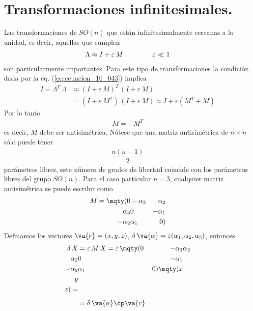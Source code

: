 \section{Transformaciones infinitesimales.}
Las transformaciones de $SO(n)$ que están infinitesimalmente cercanas a la unidad, es decir, aquellas que cumplen
\begin{align}
\Lambda \approx I + \varepsilon \, M \hspace{1.5cm} \varepsilon \ll 1
\label{eq:ecuacion_10_062}
\end{align}
son particularmente importantes. Para este tipo de transformaciones la condición dada por la eq. (\ref{eq:ecuacion_10_043}) implica
\begin{align}
I = \Lambda^{T} \, \Lambda &\approx (I + \varepsilon \, M)^{T} \, (I + \varepsilon \, M) \label{eq:ecuacion_10_063} \\[0.5em]
&= (I + \varepsilon \, M^{T}) \, (I + \varepsilon \, M)  \approx I + \varepsilon (M^{T} + M) \label{eq:ecuacion_10_064}
\end{align}
Por lo tanto
\begin{align}
M = - M^{T}
\label{eq:ecuacion_10_065}
\end{align}
es decir, $M$ debe ser antisimétrica. Nótese que una matriz antisimétrica de $n \times n$ sólo puede tener
\begin{align*}
\dfrac{n(n-1)}{2}
\end{align*}
parámetros libres, este número de grados de libertad coincide con los parámetros libres del grupo $SO(n)$. Para el caso particular $n = 3$, cualquier matriz antisimétrica se puede escribir como
\begin{align}
M = \mqty(0 & -\alpha_{3} & \alpha_{2} \\ \alpha_{3} & 0 & -\alpha_{1} \\ -\alpha_{2} & \alpha_{1} & 0)
\label{eq:ecuacion_10_066}
\end{align}
Definamos los vectores $\va{r} = (x, y ,z)$, $\delta \, \va{\alpha} = \varepsilon (\alpha_{1}, \alpha_{2}, \alpha_{3})$, entonces
\begin{align}
\delta \, X &= \varepsilon \, M \, X = \varepsilon \, \mqty(0 & -\alpha_{3} & \alpha_{2} \\ \alpha_{3} & 0 & -\alpha_{1} \\ -\alpha_{2} & \alpha_{1} & 0) \mqty(x \\ y \\ z) = \nonumber \\[0.5em]
&= \delta \, \va{\alpha} \cp \va{r} \label{eq:ecuacion_10_067}
\end{align}
